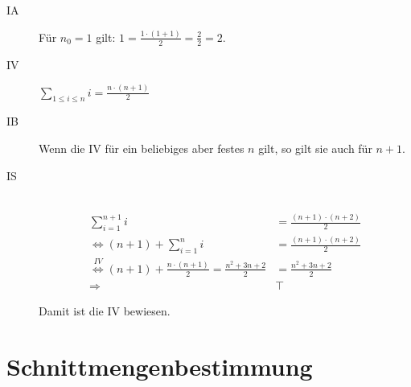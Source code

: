 \documentclass[english,ngerman,fontsize=9pt,intoc,index=totoc,refpage,listof=totoc,draft]{scrbook}
\numberwithin{equation}{section}
\begin{document}
\begin{description}
  \item [{IA}] Für $n_0=1$ gilt: $1=\frac{1\cdot(1+1)}{2}=\frac{2}{2}=2$.
  \item [{IV}] $\sum_{1 \leq i \leq n} i = \frac{n\cdot(n+1)}{2}$
  \item [{IB}] Wenn die IV für ein beliebiges aber festes $n$ gilt, so gilt sie auch für $n+1$.
  \item [{IS}]~
	\begin{align*}
		\sum_{i=1}^{n+1} i                                                                              & = \frac{(n+1)\cdot(n+2)}{2} \\
		\Leftrightarrow(n+1)+\sum_{i=1}^n i                                                             & = \frac{(n+1)\cdot(n+2)}{2} \\
		\stackrel{\scriptstyle IV}{\Leftrightarrow}(n+1) + \frac{n\cdot(n+1)}{2} = \frac{n^{2}+3n+2}{2} & =\frac{n^2+3n+2}{2}         \\
		\Rightarrow                                                                                     & \top
	\end{align*}

	Damit ist die IV bewiesen.
\end{description}

\section{\label{sec:bsp-Schnittmengenbestimmung}Schnittmengenbestimmung}
\end{document}
